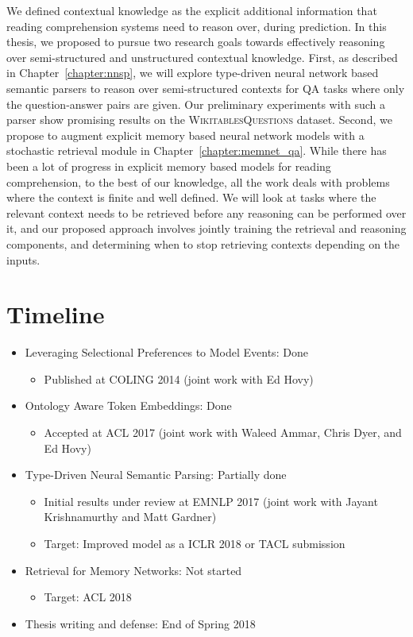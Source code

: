 We defined contextual knowledge as the explicit additional information that reading comprehension systems need to reason over, during prediction. In this thesis, we proposed to pursue two research goals towards effectively reasoning over semi-structured and unstructured contextual knowledge.
First, as described in Chapter~\ref{chapter:nnsp}, we will explore type-driven neural network based semantic parsers to reason over semi-structured contexts for QA tasks where only the question-answer pairs are given. Our preliminary experiments with such a parser show promising
results on the \textsc{WikitablesQuestions} dataset. Second, we propose to augment explicit memory based neural network models with a stochastic retrieval module in Chapter~\ref{chapter:memnet_qa}. While there has been a lot of progress in explicit memory based models for reading comprehension, to the best of our knowledge, all the
work deals with problems where the context is finite and well defined. We will look at tasks where the relevant context needs to be retrieved before any reasoning can be performed over it, and our proposed approach involves jointly training the retrieval and reasoning components, and determining
when to stop retrieving contexts depending on the inputs.

\section{Timeline}
\begin{itemize}
    \item Leveraging Selectional Preferences to Model Events: Done
    \begin{itemize}
     \item Published at COLING 2014 (joint work with Ed Hovy)
    \end{itemize}

    \item Ontology Aware Token Embeddings: Done
    \begin{itemize}
        \item Accepted at ACL 2017 (joint work with Waleed Ammar, Chris Dyer, and Ed Hovy)
    \end{itemize}
    
    \item Type-Driven Neural Semantic Parsing: Partially done
    \begin{itemize}
     \item Initial results under review at EMNLP 2017 (joint work with Jayant Krishnamurthy and Matt Gardner)
     \item Target: Improved model as a ICLR 2018 or TACL submission
    \end{itemize}

    \item Retrieval for Memory Networks: Not started
    \begin{itemize}
     \item Target: ACL 2018
    \end{itemize}
    
    \item Thesis writing and defense: End of Spring 2018
\end{itemize}
